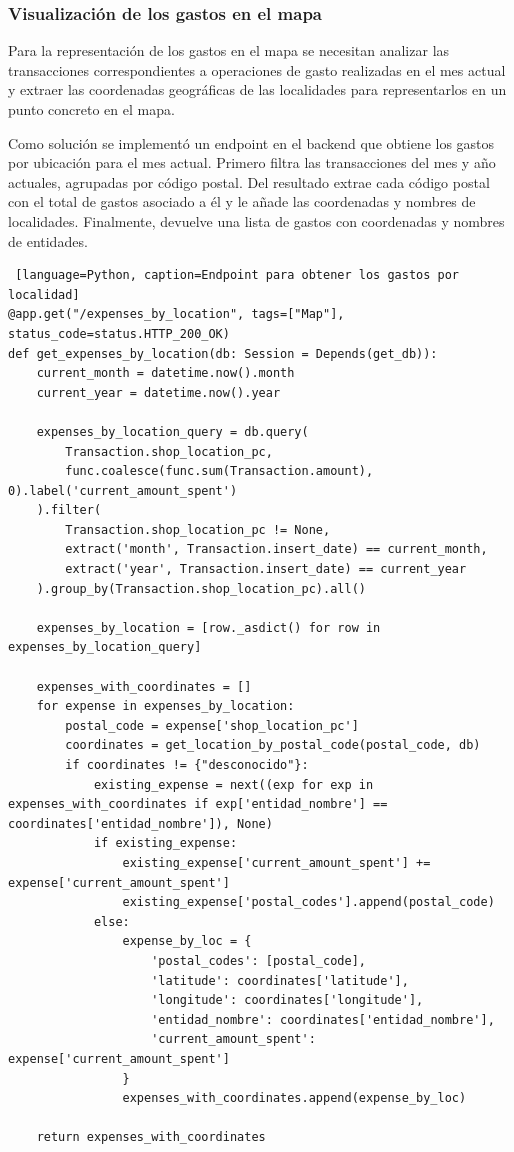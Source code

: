 \subsubsection{Visualización de los gastos en el mapa}
Para la representación de los gastos en el mapa se necesitan analizar las transacciones correspondientes a operaciones de gasto realizadas en el mes actual y extraer las coordenadas geográficas de las localidades para representarlos en un punto concreto en el mapa. 

Como solución se implementó un endpoint en el backend que obtiene los gastos por ubicación para el mes actual. Primero filtra las transacciones del mes y año actuales, agrupadas por código postal. Del resultado extrae cada código postal con el total de gastos asociado a él y le añade las coordenadas y nombres de localidades. Finalmente, devuelve una lista de gastos con coordenadas y nombres de entidades.

\begin{lstlisting} [language=Python, caption=Endpoint para obtener los gastos por localidad]
@app.get("/expenses_by_location", tags=["Map"], status_code=status.HTTP_200_OK)
def get_expenses_by_location(db: Session = Depends(get_db)):
    current_month = datetime.now().month
    current_year = datetime.now().year

    expenses_by_location_query = db.query(
        Transaction.shop_location_pc,
        func.coalesce(func.sum(Transaction.amount), 0).label('current_amount_spent')
    ).filter(
        Transaction.shop_location_pc != None,
        extract('month', Transaction.insert_date) == current_month,
        extract('year', Transaction.insert_date) == current_year
    ).group_by(Transaction.shop_location_pc).all()

    expenses_by_location = [row._asdict() for row in expenses_by_location_query]

    expenses_with_coordinates = []
    for expense in expenses_by_location:
        postal_code = expense['shop_location_pc']
        coordinates = get_location_by_postal_code(postal_code, db)
        if coordinates != {"desconocido"}:
            existing_expense = next((exp for exp in expenses_with_coordinates if exp['entidad_nombre'] == coordinates['entidad_nombre']), None)
            if existing_expense:
                existing_expense['current_amount_spent'] += expense['current_amount_spent']
                existing_expense['postal_codes'].append(postal_code)
            else:
                expense_by_loc = {
                    'postal_codes': [postal_code],
                    'latitude': coordinates['latitude'],
                    'longitude': coordinates['longitude'],
                    'entidad_nombre': coordinates['entidad_nombre'],
                    'current_amount_spent': expense['current_amount_spent']
                }
                expenses_with_coordinates.append(expense_by_loc)

    return expenses_with_coordinates
\end{lstlisting}

